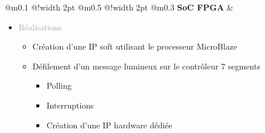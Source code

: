 \documentclass{article}
\begin{document}
\thispagestyle{student_lab_work_ENSEA}

\vspace*{0cm}

\vfill %



\begin{tabular}
    {
        @{}m{}
        @{\hspace{0.001\textwidth}}!{\color{secondaryBlue}\vline width 2pt} %
        @{}m{0.5\textwidth}
        @{\hspace{0.025\textwidth}}!{\color{secondaryBlue}\vline width 2pt} %
        @{{\hspace{0.001\textwidth}}}m{0.3\textwidth}
    }
    \textcolor{secondaryBlue}
    {
        \textbf{SoC FPGA}
    } 
    &
    \begin{itemize}
        [label={}, topsep=8pt, partopsep=0pt, itemsep=0.5pt, parsep=2pt,after=\vspace*{-\baselineskip}]
        \setlength{\itemsep}{10pt}
        \item \textcolor{darkGray}{Réalisations}
        \begin{itemize}
        [label={\textcolor{gray!100}{\checkmark}}, topsep=8pt, partopsep=0pt, itemsep=0.5pt, parsep=2pt, after=\vspace*{-\baselineskip}] 

            \item \textcolor{gray!100}{Création d'une IP soft utilisant le processeur MicroBlaze}
            \item \textcolor{gray!100}{Défilement d'un message lumineux sur le contrôleur 7 segments}
            \begin{itemize}
                [label={\textcolor{gray!100}{$\triangleright$}}, topsep=0pt, partopsep=0pt, itemsep=0.5pt, parsep=2pt]
                \item \textcolor{gray!100}{Polling}
                \item \textcolor{gray!100}{Interruptions}
                \item \textcolor{gray!100}{Création d'une IP hardware dédiée}


\end{itemize}
\end{itemize}
\end{itemize}
\end{tabular}
\end{document}
